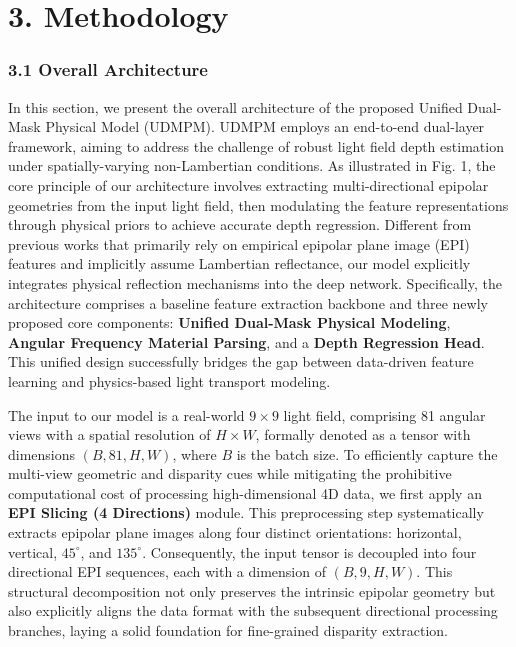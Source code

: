 \section{3. Methodology}

\subsubsection{3.1 Overall Architecture}

In this section, we present the overall architecture of the proposed Unified Dual-Mask Physical Model (UDMPM). UDMPM employs an end-to-end dual-layer framework, aiming to address the challenge of robust light field depth estimation under spatially-varying non-Lambertian conditions. As illustrated in Fig. 1, the core principle of our architecture involves extracting multi-directional epipolar geometries from the input light field, then modulating the feature representations through physical priors to achieve accurate depth regression. Different from previous works that primarily rely on empirical epipolar plane image (EPI) features and implicitly assume Lambertian reflectance, our model explicitly integrates physical reflection mechanisms into the deep network. Specifically, the architecture comprises a baseline feature extraction backbone and three newly proposed core components: \textbf{Unified Dual-Mask Physical Modeling}, \textbf{Angular Frequency Material Parsing}, and a \textbf{Depth Regression Head}. This unified design successfully bridges the gap between data-driven feature learning and physics-based light transport modeling.

The input to our model is a real-world $9 \times 9$ light field, comprising 81 angular views with a spatial resolution of $H \times W$, formally denoted as a tensor with dimensions $(B, 81, H, W)$, where $B$ is the batch size. To efficiently capture the multi-view geometric and disparity cues while mitigating the prohibitive computational cost of processing high-dimensional 4D data, we first apply an \textbf{EPI Slicing (4 Directions)} module. This preprocessing step systematically extracts epipolar plane images along four distinct orientations: horizontal, vertical, $45^\circ$, and $135^\circ$. Consequently, the input tensor is decoupled into four directional EPI sequences, each with a dimension of $(B, 9, H, W)$. This structural decomposition not only preserves the intrinsic epipolar geometry but also explicitly aligns the data format with the subsequent directional processing branches, laying a solid foundation for fine-grained disparity extraction.

